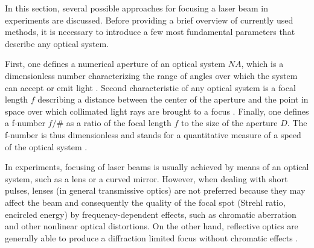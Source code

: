 In this section, several possible approaches for focusing a laser beam in experiments are discussed. Before providing a brief overview of currently used methods, it is necessary to introduce a few most fundamental parameters that describe any optical system.

First, one defines a numerical aperture of an optical system $ N\!A $, which is a dimensionless number characterizing the range of angles over which the system can accept or emit light \cite{Greivenkamp2004}. Second characteristic of any optical system is a focal length $ f $ describing a distance between the center of the aperture and the point in space over which collimated light rays are brought to a focus \cite{Greivenkamp2004}. Finally, one defines a f-number $ f/\# $ as a ratio of the focal length $ f $ to the size of the aperture $ D $. The f-number is thus dimensionless and stands for a quantitative measure of a speed of the optical system \cite{Smith2007}.

In experiments, focusing of laser beams is usually achieved by means of an optical system, such as a lens or a curved mirror. However, when dealing with short pulses, lenses (in general transmissive optics) are not preferred because they may affect the beam and consequently the quality of the focal spot (Strehl ratio, encircled energy) by frequency-dependent effects, such as chromatic aberration and other nonlinear optical distortions. On the other hand, reflective optics are generally able to produce a diffraction limited focus without chromatic effects \cite{Marimont1994}.